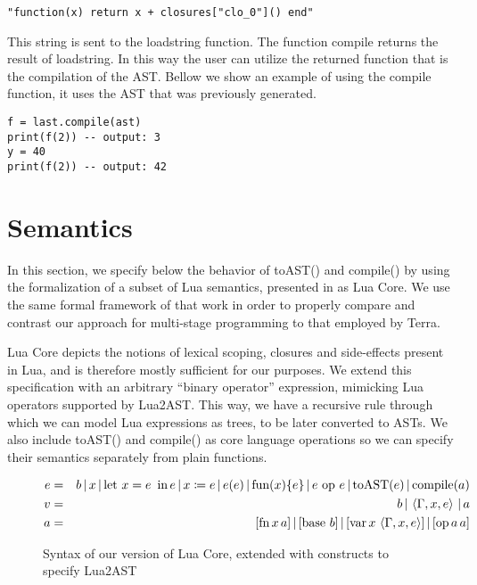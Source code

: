 \documentclass[english]{llncs}
\begin{document}
\begin{verbatim}
"function(x) return x + closures["clo_0"]() end"
\end{verbatim}

This string is sent to the loadstring function.
The function compile returns the result of loadstring.
In this way the user can utilize the returned function that is the compilation of the AST.
Bellow we show an example of using the compile function, it uses the AST that was previously generated.


\begin{verbatim}
f = last.compile(ast)
print(f(2)) -- output: 3
y = 40
print(f(2)) -- output: 42
\end{verbatim}



\section{Semantics}

\label{sec:semantics}

In this section, we specify below the behavior of toAST() and compile()
by using the formalization of a subset of Lua semantics, presented
in \cite{DeVito2013Terra} as Lua Core. We use the same formal framework
of that work in order to properly compare and contrast our approach
for multi-stage programming to that employed by Terra.

Lua Core depicts the notions of lexical scoping, closures and side-effects
present in Lua, and is therefore mostly sufficient for our purposes.
We extend this specification with an arbitrary ``binary operator''
expression, mimicking Lua operators supported by Lua2AST. This way,
we have a recursive rule through which we can model Lua expressions
as trees, to be later converted to ASTs. We also include toAST() and
compile() as core language operations so we can specify their semantics
separately from plain functions.

\begin{figure}[t]
\begin{eqnarray*}
e & = & b\,|\, x\,|\,\mbox{let \ensuremath{x=e}\,\ in\,\ensuremath{e}}\,|\, x\coloneqq e\,|\, e(e)\,|\,\mbox{fun}(x)\{e\}\,|\, e\mbox{ op }e\,|\,\mbox{toAST}(e)\,|\,\mbox{compile}(a)\\
v & = & b\,|\,\left\langle \Gamma,x,e\right\rangle \,|\, a\\
a & = & [\mbox{fn\,\ensuremath{x}\,\ensuremath{a}}]\,|\,[\mbox{base \ensuremath{b}}]\,|\,[\mbox{var}\, x\,\left\langle \Gamma,x,e\right\rangle ]\,|\,[\mbox{op\,\ensuremath{a}\,\ensuremath{a}}]
\end{eqnarray*}
\protect\caption{\label{fig:LuaCoreSyntax}Syntax of our version of Lua Core, extended
with constructs to specify Lua2AST}
\end{figure}
\end{document}
